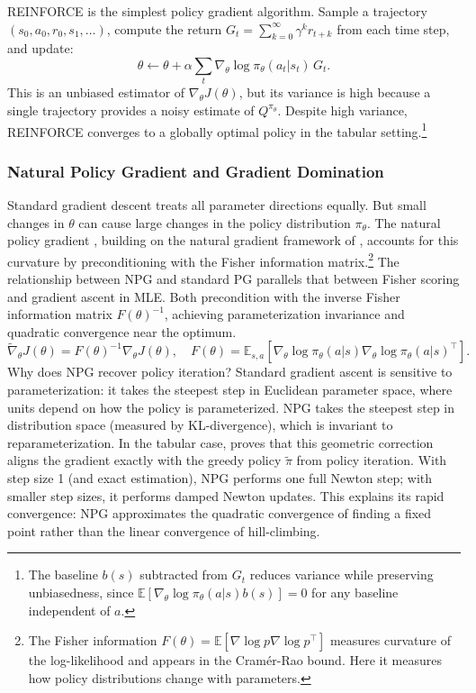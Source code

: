 REINFORCE \citep{williams1992} is the simplest policy gradient algorithm. Sample a trajectory $(s_0, a_0, r_0, s_1, \ldots)$, compute the return $G_t = \sum_{k=0}^\infty \gamma^k r_{t+k}$ from each time step, and update:
\begin{equation}
\theta \leftarrow \theta + \alpha \sum_t \nabla_\theta \log \pi_\theta(a_t|s_t) \, G_t.
\end{equation}
This is an unbiased estimator of $\nabla_\theta J(\theta)$, but its variance is high because a single trajectory provides a noisy estimate of $Q^{\pi_\theta}$. Despite high variance, REINFORCE converges to a globally optimal policy in the tabular setting.\footnote{The baseline $b(s)$ subtracted from $G_t$ reduces variance while preserving unbiasedness, since $\mathbb{E}[\nabla_\theta \log \pi_\theta(a|s) b(s)] = 0$ for any baseline independent of $a$.}

\subsubsection{Natural Policy Gradient and Gradient Domination}

Standard gradient descent treats all parameter directions equally. But small changes in $\theta$ can cause large changes in the policy distribution $\pi_\theta$. The natural policy gradient \citep{Kakade2001}, building on the natural gradient framework of \citet{amari1998natural}, accounts for this curvature by preconditioning with the Fisher information matrix.\footnote{The Fisher information $F(\theta) = \mathbb{E}[\nabla \log p \nabla \log p^\top]$ measures curvature of the log-likelihood and appears in the Cram\'er-Rao bound. Here it measures how policy distributions change with parameters.} The relationship between NPG and standard PG parallels that between Fisher scoring and gradient ascent in MLE. Both precondition with the inverse Fisher information matrix $F(\theta)^{-1}$, achieving parameterization invariance and quadratic convergence near the optimum.
\begin{equation}
\tilde{\nabla}_\theta J(\theta) = F(\theta)^{-1} \nabla_\theta J(\theta), \quad F(\theta) = \mathbb{E}_{s,a} \left[ \nabla_\theta \log \pi_\theta(a|s) \nabla_\theta \log \pi_\theta(a|s)^\top \right].
\end{equation}
Why does NPG recover policy iteration? Standard gradient ascent is sensitive to parameterization: it takes the steepest step in Euclidean parameter space, where units depend on how the policy is parameterized. NPG takes the steepest step in distribution space (measured by KL-divergence), which is invariant to reparameterization. In the tabular case, \citet[Theorem~2]{Kakade2001} proves that this geometric correction aligns the gradient exactly with the greedy policy $\tilde{\pi}$ from policy iteration. With step size 1 (and exact estimation), NPG performs one full Newton step; with smaller step sizes, it performs damped Newton updates. This explains its rapid convergence: NPG approximates the quadratic convergence of finding a fixed point rather than the linear convergence of hill-climbing.

